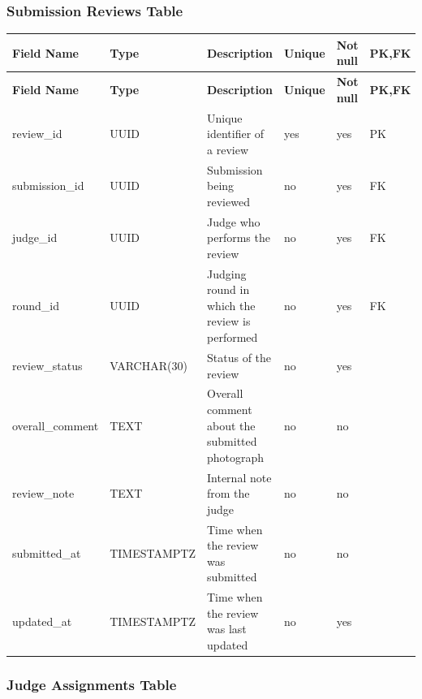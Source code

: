 \vspace{1em}
\subsubsection{Submission Reviews Table}
\label{subsubsec:submission-reviews-table}

\vspace{0.5em}
\renewcommand{\arraystretch}{1.15}
\setlength{\tabcolsep}{4pt}
\small
\begin{longtable}{|>{\raggedright\arraybackslash}p{}|>{\raggedright\arraybackslash}p{}|>{\raggedright\arraybackslash}p{}|>{\centering\arraybackslash}p{}|>{\centering\arraybackslash}p{}|>{\centering\arraybackslash}p{}|}
\hline
\textbf{Field Name} & \textbf{Type} & \textbf{Description} & \textbf{Unique} & \textbf{Not null} & \textbf{PK,FK} \\
\hline
\endfirsthead
\textbf{Field Name} & \textbf{Type} & \textbf{Description} & \textbf{Unique} & \textbf{Not null} & \textbf{PK,FK} \\
\hline
\endhead
review\_id & UUID & Unique identifier of a review & yes & yes & PK \\
\hline
submission\_id & UUID & Submission being reviewed & no & yes & FK \\
\hline
judge\_id & UUID & Judge who performs the review & no & yes & FK \\
\hline
round\_id & UUID & Judging round in which the review is performed & no & yes & FK \\
\hline
review\_status & VARCHAR(30) & Status of the review & no & yes & \\
\hline
overall\_comment & TEXT & Overall comment about the submitted photograph & no & no & \\
\hline
review\_note & TEXT & Internal note from the judge & no & no & \\
\hline
submitted\_at & TIMESTAMPTZ & Time when the review was submitted & no & no & \\
\hline
updated\_at & TIMESTAMPTZ & Time when the review was last updated & no & yes & \\
\hline
\end{longtable}

\vspace{1em}
\subsubsection{Judge Assignments Table}
\label{subsubsec:judge-assignments-table}

